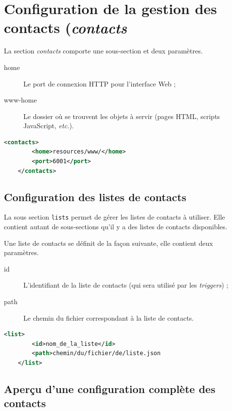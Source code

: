 \documentclass{article}
\begin{document}
\pagebreak
\section{Configuration de la gestion des contacts (\emph{contacts}}

La section \emph{contacts} comporte une sous-section et deux paramètres.

\begin{description}
    \item[home] Le port de connexion HTTP pour l'interface Web ;
    \item[www-home] Le dossier où se trouvent les objets à servir (pages HTML, scripts JavaScript, \emph{etc.}).
\end{description}

\lstset{language=xml}
\begin{lstlisting}[language=xml,name=Configuration du serveur Web]
    <contacts>
        <home>resources/www/</home>
        <port>6001</port> 
    </contacts>
\end{lstlisting}

\subsection{Configuration des listes de contacts}

La sous section \texttt{lists} permet de gérer les listes de contacts à utiliser. Elle contient autant de sous-sections qu'il y a des listes de contacts disponibles.

Une liste de contacts se définit de la façon suivante, elle contient deux paramètres.

\begin{description}
    \item[id] L'identifiant de la liste de contacts (qui sera utilisé par les \emph{triggers}) ;
    \item[path] Le chemin du fichier correspondant à la liste de contacts.
\end{description}

\begin{lstlisting}[language=xml,name=Définition d'une liste de contacts]
    <list>
        <id>nom_de_la_liste</id>
        <path>chemin/du/fichier/de/liste.json
    </list>
\end{lstlisting}

\subsection{Aperçu d'une configuration complète des contacts}
\end{document}
